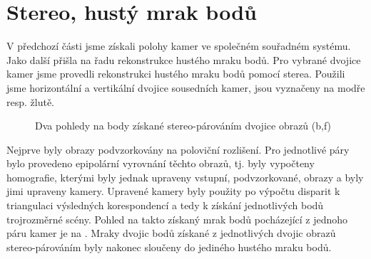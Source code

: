 \documentclass[11pt,oneside,a4paper,pdftex]{article}   %
\begin{document}
	
\section{Stereo, hustý mrak bodů}
	
	V předchozí části jsme získali polohy kamer ve společném souřadném systému. Jako další
	přišla na řadu rekonstrukce hustého mraku bodů.
	Pro vybrané dvojice kamer jsme provedli rekonstrukci hustého mraku bodů pomocí sterea.  Použili jsme
	horizontální a vertikální dvojice sousedních kamer, jsou vyznačeny na 
	modře resp. žlutě.

			\begin{figure}[htb]
					\centering
				\caption{Dva pohledy na body získané stereo-párováním dvojice obrazů (b,f)}
				\label{figStereoPair26}
			\end{figure}
	
	Nejprve byly obrazy podvzorkovány na poloviční rozlišení. Pro jednotlivé páry bylo provedeno
	epipolární vyrovnání těchto obrazů, tj. byly vypočteny homografie, kterými byly jednak upraveny
	vstupní, podvzorkované, obrazy a byly jimi upraveny kamery. Upravené kamery byly použity po výpočtu
	disparit k triangulaci výsledných korespondencí a tedy k získání jednotlivých bodů trojrozměrné
	scény. Pohled na takto získaný mrak bodů pocházející z jednoho páru kamer je na
	. Mraky dvojic bodů získané z jednotlivých dvojic obrazů stereo-párováním
	byly nakonec sloučeny do jediného hustého mraku bodů.
\end{document}
